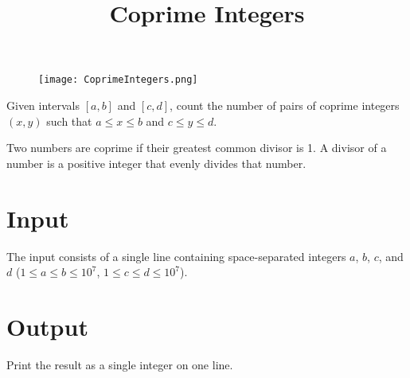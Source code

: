 \documentclass{article}
\title{Coprime Integers}
\date{}
\begin{document}
\maketitle
\begin{figure}[h!]
\centering
\texttt{[image: CoprimeIntegers.png]}
\end{figure}


Given intervals $[a, b]$ and $[c, d]$, count the number of pairs of
coprime integers $(x, y)$ such that $a \le x \le b$ and $c \le y \le d$.

Two numbers are coprime if their greatest common divisor is 1.
A divisor of a number is a positive integer that evenly divides
that number.

\section{Input}

The input consists of a single line containing space-separated integers
$a$, $b$, $c$, and $d$ ($1 \le a \le b \le 10^7$, $1 \le c \le d \le 10^7$).

\section{Output}

Print the result as a single integer on one line.

\end{document}
